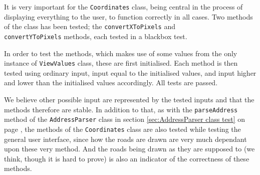 It is very important for the \texttt{Coordinates} class, being central in the process of displaying everything to the user, to function correctly in all cases. Two methods of the class has been tested; the \texttt{convertXToPixels} and \\ \texttt{convertYToPixels} methods, each tested in a blackbox test.

In order to test the methods, which makes use of some values from the only instance of \texttt{ViewValues} class, these are first initialised. Each method is then tested  using ordinary input, input equal to the initialised values, and input higher and lower than the initialised values accordingly. All tests are passed.

We believe other possible input are represented by the tested inputs and that the methods therefore are stable. In addition to that, as with the \texttt{parseAddress} method of the \texttt{AddressParser} class in section \ref{sec:AddressParser class test} on page \pageref{sec:AddressParser class test}, the methods of the \texttt{Coordinates} class are also tested while testing the general user interface, since how the roads are drawn are very much dependant upon these very method. And the roads being drawn as they are supposed to (we think, though it is hard to prove) is also an indicator of the correctness of these methods.